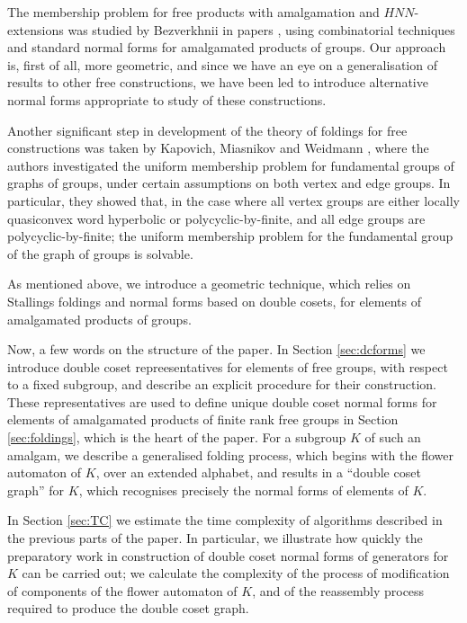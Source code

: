 \documentclass[a4paper,12pt]{article}
\numberwithin{equation}{section}
\numberwithin{figure}{section}
\begin{document}
The membership problem for free products with amalgamation and
$HNN$-extensions was studied by Bezverkhnii in papers
\cite{bez81,bez86,bez90,bez91}, using  combinatorial
techniques and standard normal forms for  amalgamated products of
groups. Our approach is, first of all, more geometric, and since
we have an eye on a generalisation of results to other free
constructions, we have been led to introduce alternative normal forms
 appropriate to
study of these constructions.

Another significant step in development of the theory of foldings for  
free constructions
 was taken by Kapovich, Miasnikov and Weidmann
\cite{KMW03}, where the authors investigated the uniform membership
problem for fundamental groups of graphs of groups, under certain
assumptions on both vertex and edge groups. In particular, they
showed that, in the case where all vertex groups are either locally
quasiconvex word hyperbolic or polycyclic-by-finite, and all edge
groups are polycyclic-by-finite; the uniform membership problem for the
fundamental group of the graph of groups is solvable.

As mentioned above, we  introduce a  geometric
technique, which relies on Stallings foldings and
normal forms based on double cosets, for elements of amalgamated products of
groups.

Now, a few words on the structure of the paper. In Section
\ref{sec:dcforms} we introduce double coset repreesentatives for
elements of free groups, with respect to a fixed subgroup,
and
  describe an explicit procedure
 for their construction.
These representatives are used to define unique double coset normal forms
for elements of
amalgamated products of finite rank free groups in Section  \ref{sec:foldings}, which
 is the heart of the paper. For a subgroup $K$ of such an amalgam, we
describe a generalised folding process, which begins with the flower automaton
of $K$, over an extended alphabet, and results in
a ``double coset graph'' for $K$, which  recognises
precisely the  normal forms of elements of $K$.

In Section \ref{sec:TC} we estimate the time complexity of
algorithms described in the previous parts of the paper. In
particular, we illustrate how quickly the  preparatory
work in construction of  double coset normal forms of generators
for $K$  can be carried out; we calculate  the complexity of the process of 
modification of
components of the flower automaton of $K$, and of the reassembly process required to
produce the double coset graph.
\end{document}

